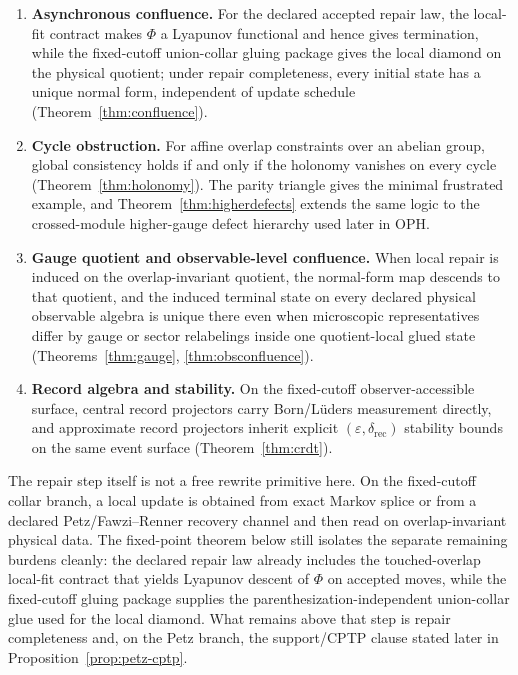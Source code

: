 \documentclass[11pt]{article}
\theoremstyle{remark}
\theoremstyle{plain}
\begin{document}
\begin{enumerate}
\item \textbf{Asynchronous confluence.} For the declared accepted repair law, the local-fit contract makes \(\Phi\) a Lyapunov functional and hence gives termination, while the fixed-cutoff union-collar gluing package gives the local diamond on the physical quotient; under repair completeness, every initial state has a unique normal form, independent of update schedule (Theorem~\ref{thm:confluence}).
\item \textbf{Cycle obstruction.} For affine overlap constraints over an abelian group, global consistency holds if and only if the holonomy vanishes on every cycle (Theorem~\ref{thm:holonomy}). The parity triangle gives the minimal frustrated example, and Theorem~\ref{thm:higherdefects} extends the same logic to the crossed-module higher-gauge defect hierarchy used later in OPH.
\item \textbf{Gauge quotient and observable-level confluence.} When local repair is induced on the overlap-invariant quotient, the normal-form map descends to that quotient, and the induced terminal state on every declared physical observable algebra is unique there even when microscopic representatives differ by gauge or sector relabelings inside one quotient-local glued state (Theorems~\ref{thm:gauge}, \ref{thm:obsconfluence}).
\item \textbf{Record algebra and stability.} On the fixed-cutoff observer-accessible surface, central record projectors carry Born/L\"uders measurement directly, and approximate record projectors inherit explicit \((\varepsilon,\delta_{\mathrm{rec}})\) stability bounds on the same event surface (Theorem~\ref{thm:crdt}).
\end{enumerate}

The repair step itself is not a free rewrite primitive here. On the
fixed-cutoff collar branch, a local update is obtained from exact Markov splice or from a
declared Petz/Fawzi--Renner recovery channel and then read on overlap-invariant physical data.
The fixed-point theorem below still isolates the separate remaining burdens cleanly: the declared
repair law already includes the touched-overlap local-fit contract that yields Lyapunov descent of
\(\Phi\) on accepted moves, while the fixed-cutoff gluing package supplies the
parenthesization-independent union-collar glue used for the local diamond. What remains above
that step is repair completeness and, on the Petz branch, the support/CPTP clause stated later in
Proposition~\ref{prop:petz-cptp}.
\end{document}
